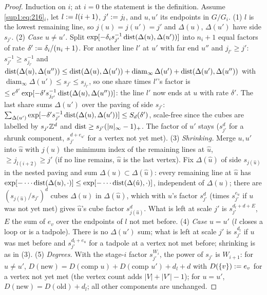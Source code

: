 \begin{proof}
Induction on $i$; at $i=0$ the statement is the definition. Assume \eqref{sup1:eq:216}$_i$, let $l:= l(i+1)$, $j':= j_l$, and $u,u'$ its endpoints in $G/G_i$.
(1) $l$ is the lowest remaining line, so $j(u)=j(u')=j'$ and $\Delta(u)$, $\Delta(u')$ have side $s_{j'}$.
(2) \emph{Case $u\ne u'$.} Split $\exp[-\delta_is_{j'}^{-1}\operatorname{dist}(\Delta(u),\Delta(u'))]$ into $n_i+1$ equal factors of rate $\delta':=\delta_i/(n_i+1)$. For another line $l'$ at $u'$ with far end $u''$ and $j_{l'}\ge j'$: $s_{j'}^{-1}\ge s_{j_{l'}}^{-1}$ and $\operatorname{dist}(\Delta(u),\Delta(u''))\le\operatorname{dist}(\Delta(u),\Delta(u'))+\operatorname{diam}_\infty\Delta(u')+\operatorname{dist}(\Delta(u'),\Delta(u''))$ with $\operatorname{diam}_\infty\Delta(u')\le s_{j'}\le s_{j_{l'}}$, so one share times $l'$'s factor is $\le e^{\delta'}\exp[-\delta's_{j_{l'}}^{-1}\operatorname{dist}(\Delta(u),\Delta(u''))]$: the line $l'$ now ends at $u$ with rate $\delta'$. The last share sums $\Delta(u')$ over the paving of side $s_{j'}$: $\sum_{\Delta(u')}\exp[-\delta's_{j'}^{-1}\operatorname{dist}(\Delta(u),\Delta(u'))]\le S_d(\delta')$, scale-free since the cubes are labelled by $s_{j'}\mathbb Z^d$ and $\operatorname{dist}\ge s_{j'}(|n|_\infty-1)_+$. The factor of $u'$ stays ($s_{j'}^d$ for a shrunk component, $s_{j'}^{d+e_{u'}}$ for a vertex not yet met).
(3) \emph{Shrinking.} Merge $u,u'$ into $\hat u$ with $j(\hat u)$ the minimum index of the remaining lines at $\hat u$, $\ge j_{l(i+2)}\ge j'$ (if no line remains, $\hat u$ is the last vertex). Fix $\Delta(\hat u)$ of side $s_{j(\hat u)}$ in the nested paving and sum $\Delta(u)\subset\Delta(\hat u)$: every remaining line at $\hat u$ has $\exp[-\cdots\operatorname{dist}(\Delta(u),\cdot)]\le\exp[-\cdots\operatorname{dist}(\Delta(\hat u),\cdot)]$, independent of $\Delta(u)$; there are $(s_{j(\hat u)}/s_{j'})^d$ cubes $\Delta(u)$ in $\Delta(\hat u)$, which with $u$'s factor $s_{j'}^d$ (times $s_{j'}^{e_u}$ if $u$ was not yet met) gives $\hat u$'s cube factor $s_{j(\hat u)}^d$. What is left at scale $j'$ is $s_{j'}^{d_l+d+E}$, $E$ the sum of $e_v$ over the endpoints of $l$ not met before.
(4) \emph{Case $u=u'$} ($l$ closes a loop or is a tadpole). There is no $\Delta(u')$ sum; what is left at scale $j'$ is $s_{j'}^{d_l}$ if $u$ was met before and $s_{j'}^{d_l+e_u}$ for a tadpole at a vertex not met before; shrinking is as in (3).
(5) \emph{Degrees.} With the stage-$i$ factor $s_{j'}^{W_i}$, the power of $s_{j'}$ is $W_{i+1}$: for $u\ne u'$, $D(\text{new})=D(\text{comp }u)+D(\text{comp }u')+d_l+d$ with $D(\{v\}):= e_v$ for a vertex not yet met (the vertex count adds $|V|+|V'|-1$); for $u=u'$, $D(\text{new})=D(\text{old})+d_l$; all other components are unchanged.

\end{proof}
